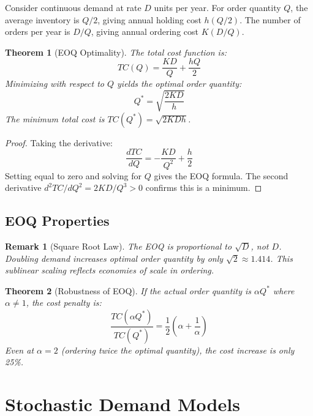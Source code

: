 \documentclass[a4paper, 11pt]{article}
\newtheorem{theorem}{Theorem}[section]
\newtheorem{remark}{Remark}[section]
\begin{document}
Consider continuous demand at rate $D$ units per year. For order quantity $Q$, the
average inventory is $Q/2$, giving annual holding cost $h(Q/2)$. The number of orders
per year is $D/Q$, giving annual ordering cost $K(D/Q)$.

\begin{theorem}[EOQ Optimality]
The total cost function is:
\begin{equation}
TC(Q) = \frac{KD}{Q} + \frac{hQ}{2}
\end{equation}
Minimizing with respect to $Q$ yields the optimal order quantity:
\begin{equation}
Q^* = \sqrt{\frac{2KD}{h}}
\end{equation}
The minimum total cost is $TC(Q^*) = \sqrt{2KDh}$.
\end{theorem}

\begin{proof}
Taking the derivative:
\begin{equation}
\frac{dTC}{dQ} = -\frac{KD}{Q^2} + \frac{h}{2}
\end{equation}
Setting equal to zero and solving for $Q$ gives the EOQ formula. The second derivative
$d^2TC/dQ^2 = 2KD/Q^3 > 0$ confirms this is a minimum.
\end{proof}

\subsection{EOQ Properties}

\begin{remark}[Square Root Law]
The EOQ is proportional to $\sqrt{D}$, not $D$. Doubling demand increases optimal
order quantity by only $\sqrt{2} \approx 1.414$. This sublinear scaling reflects
economies of scale in ordering.
\end{remark}

\begin{theorem}[Robustness of EOQ]
If the actual order quantity is $\alpha Q^*$ where $\alpha \neq 1$, the cost penalty is:
\begin{equation}
\frac{TC(\alpha Q^*)}{TC(Q^*)} = \frac{1}{2}\left(\alpha + \frac{1}{\alpha}\right)
\end{equation}
Even at $\alpha = 2$ (ordering twice the optimal quantity), the cost increase is only 25\%.
\end{theorem}

\section{Stochastic Demand Models}
\end{document}
